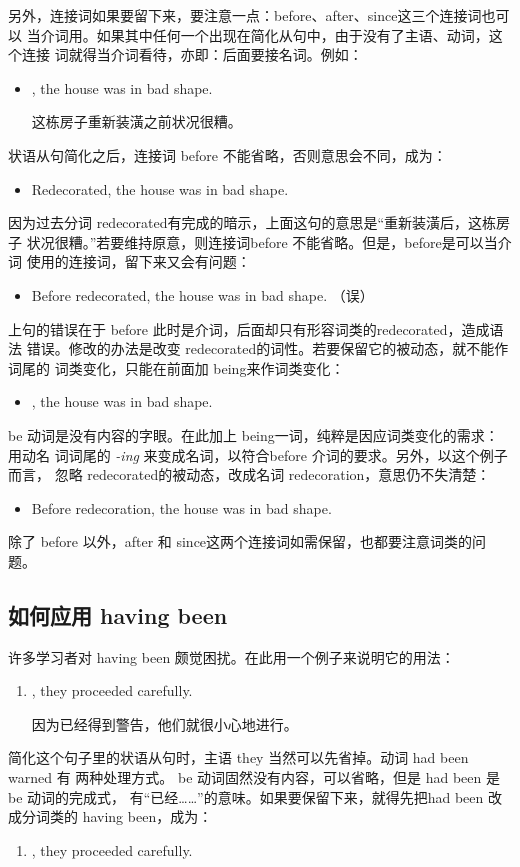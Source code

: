另外，连接词如果要留下来，要注意一点：before、after、since这三个连接词也可以
当介词用。如果其中任何一个出现在简化从句中，由于没有了主语、动词，这个连接
词就得当介词看待，亦即：后面要接名词。例如：
\begin{itemize}
\item {}, the house was in bad shape.

  这栋房子重新装潢之前状况很糟。
\end{itemize}
状语从句简化之后，连接词 before 不能省略，否则意思会不同，成为：
\begin{itemize}
\item   Redecorated, the house was in bad shape.
\end{itemize}
因为过去分词 redecorated有完成的暗示，上面这句的意思是“重新装潢后，这栋房子
状况很糟。”若要维持原意，则连接词before 不能省略。但是，before是可以当介词
使用的连接词，留下来又会有问题：
\begin{itemize}
\item Before redecorated, the house was in bad shape. （误）
\end{itemize}
上句的错误在于 before 此时是介词，后面却只有形容词类的redecorated，造成语法
错误。修改的办法是改变 redecorated的词性。若要保留它的被动态，就不能作词尾的
词类变化，只能在前面加 being来作词类变化：
\begin{itemize}
\item {}, the house was in bad shape.
\end{itemize}

be 动词是没有内容的字眼。在此加上 being一词，纯粹是因应词类变化的需求：用动名
词词尾的 \emph{-ing} 来变成名词，以符合before 介词的要求。另外，以这个例子而言，
忽略 redecorated的被动态，改成名词 redecoration，意思仍不失清楚：
\begin{itemize}
\item Before redecoration, the house was in bad shape.
\end{itemize}

除了 before 以外，after 和 since这两个连接词如需保留，也都要注意词类的问题。

\subsection{如何应用 having been}

许多学习者对 having been 颇觉困扰。在此用一个例子来说明它的用法：
\begin{enumerate}
\item {}, they proceeded carefully.

  因为已经得到警告，他们就很小心地进行。
\end{enumerate}
简化这个句子里的状语从句时，主语 they 当然可以先省掉。动词 had been warned 有
两种处理方式。 be 动词固然没有内容，可以省略，但是 had been 是be 动词的完成式，
有“已经……”的意味。如果要保留下来，就得先把had been 改成分词类的 having
been，成为：
\begin{enumerate}[resume]
\item {}, they proceeded carefully.
\end{enumerate}

